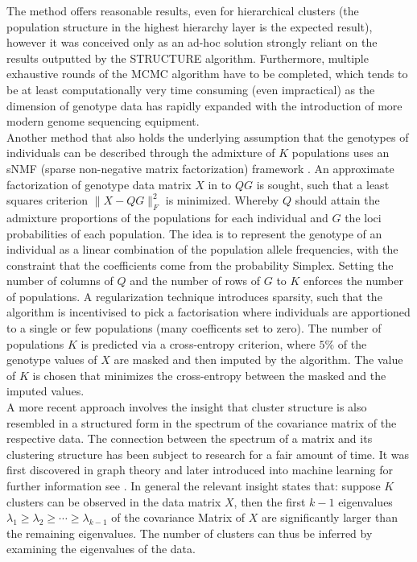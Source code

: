 \documentclass[a4paper, 11pt]{article}
\begin{document}
The method offers reasonable results, even for hierarchical clusters (the population structure in the highest hierarchy layer is the expected result), however it was conceived only as an ad-hoc solution strongly reliant on the results outputted by the STRUCTURE algorithm. Furthermore, multiple exhaustive rounds of the MCMC algorithm have to be completed, which tends to be at least computationally very time consuming (even impractical) as the dimension of genotype data has rapidly expanded with the introduction of more modern genome sequencing equipment. \\
Another method that also holds the underlying assumption that the genotypes of individuals can be described through the admixture of $K$ populations uses an sNMF (sparse non-negative matrix factorization) framework \parencite{frichot2014fast}. An approximate factorization of genotype data matrix $X$ in to $QG$ is sought, such that a least squares criterion $\parallel X - QG \parallel^2_F$ is minimized. Whereby $Q$ should attain the admixture proportions of the populations for each individual and $G$ the loci probabilities of each population. The idea is to represent the genotype of an individual as a linear combination of the population allele frequencies, with the constraint that the coefficients come from the probability Simplex. Setting the number of columns of $Q$ and the number of rows of $G$ to $K$ enforces the number of populations. A regularization technique introduces sparsity, such that the algorithm is incentivised to pick a factorisation where individuals are apportioned to a single or few populations (many coefficents set to zero). The number of populations $K$ is predicted via a cross-entropy criterion, where $5\% $ of the genotype values of $X$ are masked and then imputed by the algorithm. The value of $K$ is chosen that minimizes the cross-entropy between the masked and the imputed values.\\
A more recent approach involves the insight that cluster structure is also resembled in a structured form in the spectrum of the covariance matrix of the respective data. The connection between the spectrum of a matrix and its clustering structure has been subject to research for a fair amount of time. It was first discovered in graph theory \cite{donath1973lower} \cite{fiedler1973algebraic} and later introduced into machine learning \parencite{shi2000normalized, meila2001random, ng2002spectral} for further information see \cite{von2007tutorial}. In general the relevant insight states that: suppose $K$ clusters can be observed in the data matrix $X$, then the first $k-1$ eigenvalues $\lambda_1 \geq \lambda_2 \geq \cdots \geq \lambda_{k-1}$ of the covariance Matrix of $X$ are significantly larger than the remaining eigenvalues. The number of clusters can thus be inferred by examining the eigenvalues of the data.\\
\end{document}
